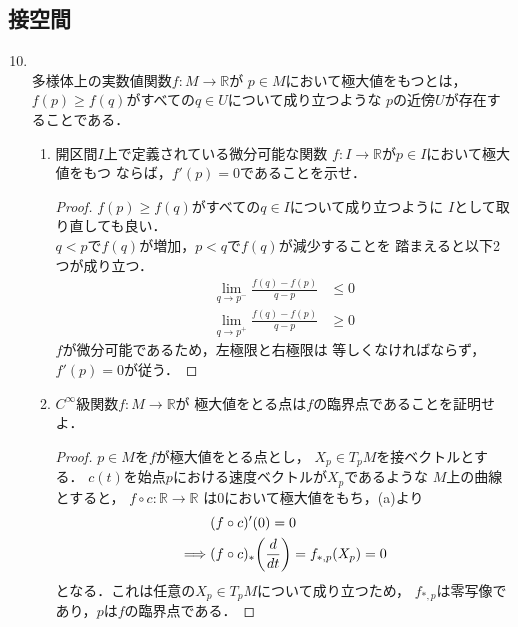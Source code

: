 \documentclass[dvipdfmx,a4paper,11pt]{jsarticle}
\begin{document}
\subsection{接空間}
\begin{enumerate}
  \setcounter{enumi}{9}
  \item {}\\
  \label{secprob:8.10}
  多様体上の実数値関数$f\colon M\to\mathbb{R}$が
  $p\in M$において極大値をもつとは，
  $f(p)\geq f(q)$がすべての$q\in U$について成り立つような
  $p$の近傍$U$が存在することである．
  \begin{enumerate}
    \item 開区間$I$上で定義されている微分可能な関数
    $f\colon I\to\mathbb{R}$が$p\in I$において極大値をもつ
    ならば，$f'(p)=0$であることを示せ．
    \begin{proof}
      $f(p)\geq f(q)$がすべての$q\in I$について成り立つように
      $I$として取り直しても良い．\\
      $q<p$で$f(q)$が増加，$p<q$で$f(q)$が減少することを
      踏まえると以下2つが成り立つ．
      \begin{align}
        \lim_{q\to p^-}\frac{f(q)-f(p)}{q-p}&\leq 0\\
        \lim_{q\to p^+}\frac{f(q)-f(p)}{q-p}&\geq 0
      \end{align}
      $f$が微分可能であるため，左極限と右極限は
      等しくなければならず，$f'(p)=0$が従う．
    \end{proof}
    \item $C^\infty$級関数$f\colon M\to\mathbb{R}$が
    極大値をとる点は$f$の臨界点であることを証明せよ．
    \begin{proof}
      $p\in M$を$f$が極大値をとる点とし，
      $X_p\in T_p M$を接ベクトルとする．
      $c(t)$を始点$p$における速度ベクトルが$X_p$であるような
      $M$上の曲線とすると，
      $f\circ c\colon \mathbb{R}\to\mathbb{R}$
      は$0$において極大値をもち，(a)より
      \begin{align}
        &(f\circ c)'(0)=0\\
        \implies&
        (f\circ c)_*\qty(\frac{d}{dt})
        =f_{*,p}(X_p)=0
      \end{align}
      となる．これは任意の$X_p\in T_p M$について成り立つため，
      $f_{*,p}$は零写像であり，$p$は$f$の臨界点である．
    \end{proof}
  \end{enumerate}
\end{enumerate}

\setcounter{subsection}{10}
\end{document}
